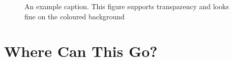 \documentclass[
]{dtuposter}
\begin{document}
\begin{dtupostercontent}
\begin{figure}
	\centering
{}
\caption{An example caption. This figure supports transparency and looks fine on 
the coloured background}\label{fig:example}
\end{figure}

\section{Where Can This Go?}


\end{dtupostercontent}
\end{document}

